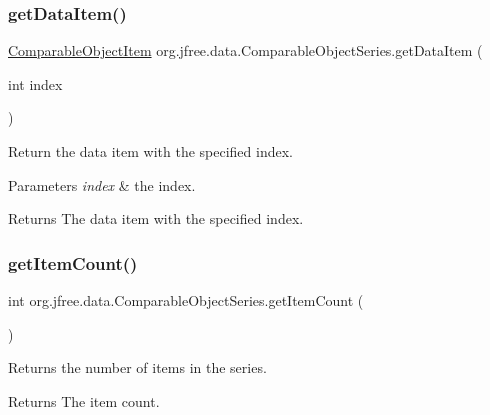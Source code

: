 \subsubsection{\texorpdfstring{get\+Data\+Item()}{getDataItem()}}
{\footnotesize\ttfamily \mbox{\hyperlink{classorg_1_1jfree_1_1data_1_1_comparable_object_item}{Comparable\+Object\+Item}} org.\+jfree.\+data.\+Comparable\+Object\+Series.\+get\+Data\+Item (\begin{DoxyParamCaption}\item[{int}]{index }\end{DoxyParamCaption})\hspace{0.3cm}{\ttfamily [protected]}}

Return the data item with the specified index.


\begin{DoxyParams}{Parameters}
{\em index} & the index.\\
\hline
\end{DoxyParams}
\begin{DoxyReturn}{Returns}
The data item with the specified index. 
\end{DoxyReturn}
\mbox{\label{classorg_1_1jfree_1_1data_1_1_comparable_object_series_a7d4456292704300127b488b286156587}} 
\subsubsection{\texorpdfstring{get\+Item\+Count()}{getItemCount()}}
{\footnotesize\ttfamily int org.\+jfree.\+data.\+Comparable\+Object\+Series.\+get\+Item\+Count (\begin{DoxyParamCaption}{ }\end{DoxyParamCaption})}

Returns the number of items in the series.

\begin{DoxyReturn}{Returns}
The item count. 
\end{DoxyReturn}
\mbox{\label{classorg_1_1jfree_1_1data_1_1_comparable_object_series_a7d89f1b44afcf80cea75b715e5e9cb36}} 
